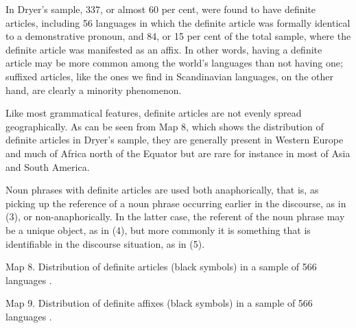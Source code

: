 
In Dryer’s sample, 337, or almost 60 per cent, were found to have definite articles, including 56 languages in which the definite article was formally identical to a demonstrative pronoun, and 84, or 15 per cent of the total sample, where the definite article was manifested as an affix. In other words, having a definite article may be more common among the world’s languages than not having one; suffixed articles, like the ones we find in Scandinavian languages, on the other hand, are clearly a minority phenomenon. 


Like most grammatical features, definite articles are not evenly spread geographically. As can be seen from Map 8, which shows the distribution of definite articles in Dryer’s sample, they are generally present in Western Europe and much of Africa north of the Equator but are rare for instance in most of Asia and South America.


Noun phrases with definite articles are used both anaphorically, that is, as picking up the reference of a noun phrase occurring earlier in the discourse, as in (3), or non-anaphorically. In the latter case, the referent of the noun phrase may be a unique object, as in (4), but more commonly it is something that is identifiable in the discourse situation, as in (5).


\label{bkm:Ref130721880}Map 8. Distribution of definite articles (black symbols) in a sample of 566 languages \citep{Dryer2005}.


Map 9. Distribution of definite affixes (black symbols) in a sample of 566 languages \citep{Dryer2005}.


